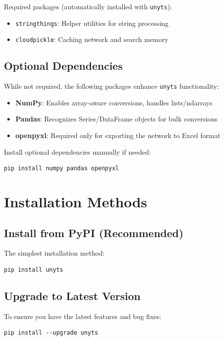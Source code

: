 \documentclass[11pt,a4paper]{report}
\begin{document}
Required packages (automatically installed with \texttt{unyts}):
\begin{itemize}[leftmargin=*]
  \item \texttt{stringthings}: Helper utilities for string processing
  \item \texttt{cloudpickle}: Caching network and search memory
\end{itemize}

\subsection{Optional Dependencies}

While not required, the following packages enhance \texttt{unyts} functionality:
\begin{itemize}[leftmargin=*]
  \item \textbf{NumPy}: Enables array-aware conversions, handles lists/ndarrays
  \item \textbf{Pandas}: Recognizes Series/DataFrame objects for bulk conversions
  \item \textbf{openpyxl}: Required only for exporting the network to Excel format
\end{itemize}

Install optional dependencies manually if needed:
\begin{lstlisting}[style=bashstyle]
pip install numpy pandas openpyxl
\end{lstlisting}

\section{Installation Methods}

\subsection{Install from PyPI (Recommended)}

The simplest installation method:
\begin{lstlisting}[style=bashstyle]
pip install unyts
\end{lstlisting}

\subsection{Upgrade to Latest Version}

To ensure you have the latest features and bug fixes:
\begin{lstlisting}[style=bashstyle]
pip install --upgrade unyts
\end{lstlisting}
\end{document}
